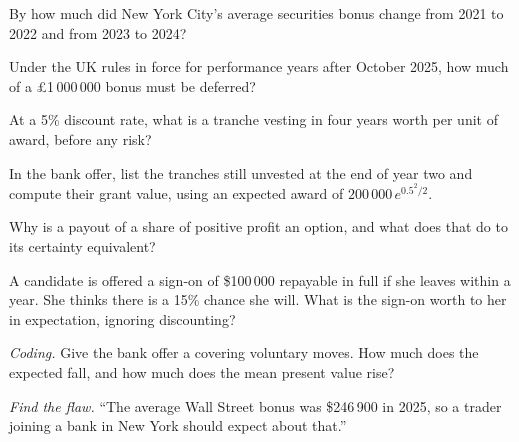 \begin{exercise}[$\star$]\label{exo:in:how-pay-works:1}
By how much did New York City's average securities bonus change from 2021 to 2022 and from 2023 to 2024?
\end{exercise}

\begin{exercise}[$\star$]\label{exo:in:how-pay-works:2}
Under the UK rules in force for performance years after October 2025, how much of a \pounds1\,000\,000 bonus must be
deferred?
\end{exercise}

\begin{exercise}[$\star$]\label{exo:in:how-pay-works:3}
At a 5\% discount rate, what is a tranche vesting in four years worth per unit of award, before any risk?
\end{exercise}

\begin{exercise}[$\star\star$]\label{exo:in:how-pay-works:4}
In the bank offer, list the tranches still unvested at the end of year two and compute their grant value, using an
expected award of $200\,000\,e^{0.5^2/2}$.
\end{exercise}

\begin{exercise}[$\star\star$]\label{exo:in:how-pay-works:5}
Why is a payout of a share of positive profit an option, and what does that do to its certainty equivalent?
\end{exercise}

\begin{exercise}[$\star\star$]\label{exo:in:how-pay-works:6}
A candidate is offered a sign-on of \$100\,000 repayable in full if she leaves within a year. She thinks there is a 15\%
chance she will. What is the sign-on worth to her in expectation, ignoring discounting?
\end{exercise}

\begin{exercise}[$\star\star\star$]\label{exo:in:how-pay-works:7}
\emph{Coding.} Give the bank offer a  covering voluntary moves. How much does the expected
 fall, and how much does the mean present value rise?
\end{exercise}

\begin{exercise}[$\star\star\star$]\label{exo:in:how-pay-works:8}
\emph{Find the flaw.} ``The average Wall Street bonus was \$246\,900 in 2025, so a trader joining a bank in New York
should expect about that.''
\end{exercise}

